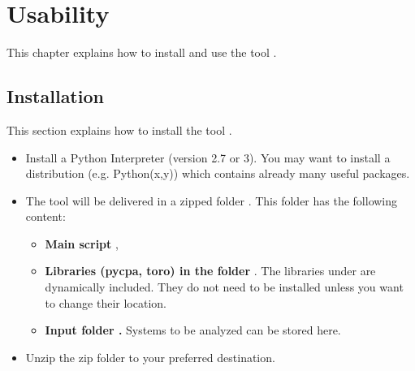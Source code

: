 \section{Usability}
\label{sec:usability}
This chapter explains how to install and use the tool \Tool.

\subsection{Installation}
This section explains how to install the tool \Tool.
\begin{itemize}[leftmargin=*]
	\item Install a Python Interpreter (version 2.7 or 3).
				You may want to install a distribution (e.g. Python(x,y)) which contains already many useful packages.
	\item The tool \Tool will be delivered in a zipped folder . 
				This folder has the following content:
				\begin{itemize}
				\item \textbf{Main script }, 
				\item \textbf{Libraries (pycpa, toro) in the folder }.
				The libraries under  are dynamically included. 
				They do not need to be installed unless you want to change their location.
				\item \textbf{Input folder .} Systems to be analyzed can be stored here.
				\end{itemize}
	\item Unzip the zip folder to your preferred destination.	
\end{itemize}


